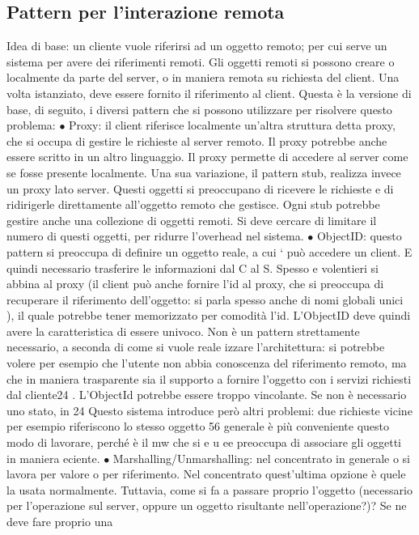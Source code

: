 \subsection{Pattern per l'interazione remota}
Idea di base: un cliente vuole riferirsi ad un oggetto remoto; per cui serve un
sistema per avere dei riferimenti remoti. Gli oggetti remoti si possono creare o
localmente da parte del server, o in maniera remota su richiesta del client. Una
volta istanziato, deve essere fornito il riferimento al client. Questa è la versione
di base, di seguito, i diversi pattern che si possono utilizzare per risolvere questo
problema:
$\bullet$ Proxy: il client riferisce localmente un'altra struttura detta proxy, che si
occupa di gestire le richieste al server remoto. Il proxy potrebbe anche
essere scritto in un altro linguaggio. Il proxy permette di accedere al server
come se fosse presente localmente.
Una sua variazione, il pattern stub, realizza invece un proxy lato server.
Questi oggetti si preoccupano di ricevere le richieste e di ridirigerle direttamente all'oggetto remoto che gestisce.
Ogni stub potrebbe gestire anche
una collezione di oggetti remoti.
Si deve cercare di limitare il numero di questi oggetti, per ridurre l'overhead nel sistema.
$\bullet$ ObjectID: questo pattern si preoccupa di definire un oggetto reale, a cui
`
può accedere un client. E quindi necessario trasferire le informazioni dal C
al S. Spesso e volentieri si abbina al proxy (il client può anche fornire l'id
al proxy, che si preoccupa di recuperare il riferimento dell'oggetto: si parla
spesso anche di nomi globali unici ), il quale potrebbe tener memorizzato
per comodità l'id. L'ObjectID deve quindi avere la caratteristica di essere
univoco.
Non è un pattern strettamente necessario, a seconda di come si vuole reale
izzare l'architettura: si potrebbe volere per esempio che l'utente non abbia
conoscenza del riferimento remoto, ma che in maniera trasparente sia il
supporto a fornire l'oggetto con i servizi richiesti dal cliente24 . L'ObjectId potrebbe essere troppo vincolante. Se
non è necessario uno stato, in
24 Questo sistema introduce però altri problemi: due richieste vicine per esempio riferiscono
lo stesso oggetto
56
generale è più conveniente questo modo di lavorare, perché è il mw che si
e u
ee
preoccupa di associare gli oggetti in maniera eciente.
$\bullet$ Marshalling/Unmarshalling: nel concentrato in generale o si lavora per
valore o per riferimento. Nel concentrato quest'ultima opzione è quele
la usata normalmente. Tuttavia, come si fa a passare proprio l'oggetto
(necessario per l'operazione sul server, oppure un oggetto risultante nell'operazione?)? Se ne deve fare proprio una
